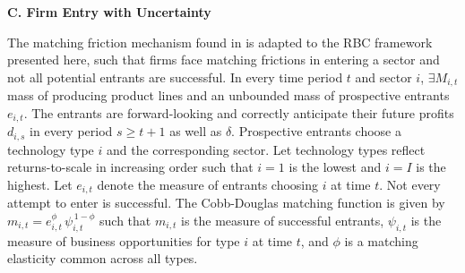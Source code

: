 \documentclass[a4paper,12pt]{article} %
\numberwithin{equation}{section} %
\numberwithin{figure}{section}
\numberwithin{table}{section}
\begin{document}
\medskip
\medskip
\noindent\textbf{C. Firm Entry with Uncertainty}
\medskip

The matching friction mechanism found in \textcite{sedlavcek2017growth} is adapted to the RBC framework presented here, such that firms face matching 
frictions in entering a sector and not all potential entrants are successful. In every time period $t$ and sector $i$, $\exists M_{i,t}$ mass of 
producing product lines and an unbounded mass of prospective entrants $e_{i,t}$. The entrants are forward-looking and correctly anticipate their future 
profits $d_{i,s}$ in every period $s\ge t+1$ as well as $\delta$. Prospective entrants choose a technology type $i$ and the corresponding sector.
Let technology types reflect returns-to-scale in increasing order such that $i = 1$ is the lowest and $i = I$ is the highest. 
Let $e_{i,t}$ denote the measure of entrants choosing $i$ at time $t$. Not every attempt to enter is successful. The Cobb-Douglas  matching function 
is given by $m_{i,t}= e_{i,t}^{\phi}\,\psi_{i,t}^{\,1-\phi}$ such that $m_{i,t}$ is the measure of successful entrants, $\psi_{i,t}$ is the measure of 
business opportunities for type $i$ at time $t$, and $\phi$ is a matching elasticity common across all types. 
\end{document}
